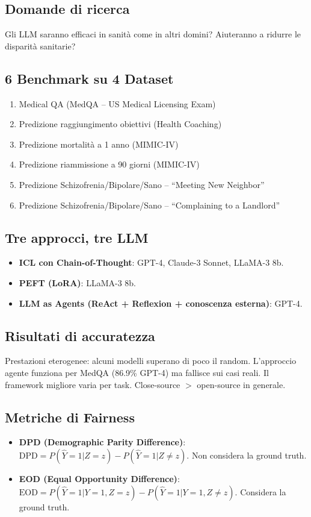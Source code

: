 \documentclass[a4paper,12pt]{article}
\begin{document}
\subsection{Domande di ricerca}
Gli LLM saranno efficaci in sanit\`a come in altri domini? Aiuteranno a ridurre le disparit\`a sanitarie?

\subsection{6 Benchmark su 4 Dataset}
\begin{enumerate}
    \item Medical QA (MedQA -- US Medical Licensing Exam)
    \item Predizione raggiungimento obiettivi (Health Coaching)
    \item Predizione mortalit\`a a 1 anno (MIMIC-IV)
    \item Predizione riammissione a 90 giorni (MIMIC-IV)
    \item Predizione Schizofrenia/Bipolare/Sano -- ``Meeting New Neighbor''
    \item Predizione Schizofrenia/Bipolare/Sano -- ``Complaining to a Landlord''
\end{enumerate}

\subsection{Tre approcci, tre LLM}
\begin{itemize}
    \item \textbf{ICL con Chain-of-Thought}: GPT-4, Claude-3 Sonnet, LLaMA-3 8b.
    \item \textbf{PEFT (LoRA)}: LLaMA-3 8b.
    \item \textbf{LLM as Agents (ReAct + Reflexion + conoscenza esterna)}: GPT-4.
\end{itemize}

\subsection{Risultati di accuratezza}
Prestazioni eterogenee: alcuni modelli superano di poco il random. L'approccio agente funziona per MedQA (86.9\% GPT-4) ma fallisce sui casi reali. Il framework migliore varia per task. Close-source $>$ open-source in generale.

\subsection{Metriche di Fairness}
\begin{itemize}
    \item \textbf{DPD (Demographic Parity Difference)}:
    $\text{DPD} = P(\hat{Y}=1|Z=z) - P(\hat{Y}=1|Z\neq z)$. Non considera la ground truth.
    \item \textbf{EOD (Equal Opportunity Difference)}:
    $\text{EOD} = P(\hat{Y}=1|Y=1,Z=z) - P(\hat{Y}=1|Y=1,Z\neq z)$. Considera la ground truth.
\end{itemize}
\end{document}
